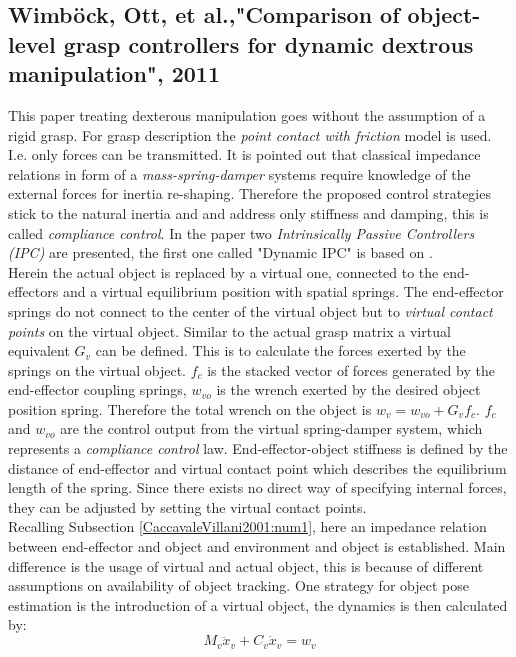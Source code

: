 \documentclass[conference]{IEEEtran}
\begin{document}
\subsection{Wimb\"ock, Ott, et al.,"Comparison of object-level grasp controllers for dynamic dextrous manipulation", 2011}\label{WimboeckOttComparisionPaper}
This paper treating dexterous manipulation goes without the assumption of a rigid grasp. For grasp description the \textit{point contact with friction }model is used. I.e. only forces can be transmitted. It is pointed out that classical impedance relations in form of a \textit{mass-spring-damper} systems require knowledge of the external forces for inertia re-shaping. Therefore the proposed control strategies stick to the natural inertia and and address only stiffness and damping, this is called \textit{compliance control}. In the paper two \textit{Intrinsically Passive Controllers (IPC)} are presented, the first one called "Dynamic IPC" is based on \cite{Stramigioli2001}.\\
Herein the actual object is replaced by a virtual one, connected to the end-effectors and a virtual equilibrium position with spatial springs. The end-effector springs do not connect to the center of the virtual object but to \textit{virtual contact points} on the virtual object. Similar to the actual grasp matrix a virtual equivalent $ G_v $ can be defined. This is to calculate the forces exerted by the springs on the virtual object. $ f_c $ is the stacked vector of forces generated by the end-effector coupling springs, $ w_{vo} $ is the wrench exerted by the desired object position spring. Therefore the total wrench on the object is $ w_v = w_{vo} + G_vf_c $. $ f_c $ and $ w_{vo} $ are the control output from the  virtual spring-damper system, which represents a \textit{compliance control} law. End-effector-object stiffness is defined by the distance of end-effector and virtual contact point which describes the equilibrium length of the spring. Since there exists no direct way of specifying internal forces, they can be adjusted by setting the virtual contact points.\\  Recalling Subsection \ref{CaccavaleVillani2001:num1}, here an impedance relation between end-effector and object and environment and object is established. Main difference is the usage of virtual and actual object, this is because of different assumptions on availability of object tracking. One strategy for object pose estimation is the introduction of a virtual object, the dynamics is then calculated by:
\begin{equation}
M_v\ddot{x}_v + C_v\dot{x}_v = w_v
\end{equation}
\end{document}
